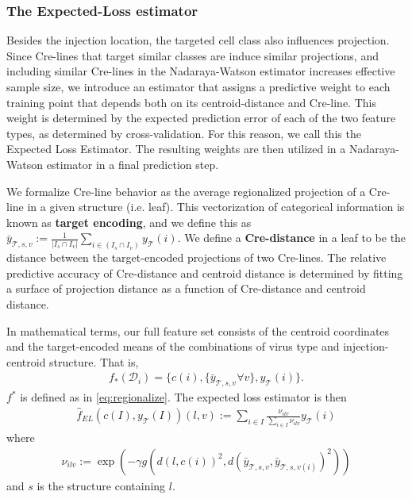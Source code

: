 \newpage
\subsubsection{The Expected-Loss estimator}

\label{supp_sec:el}

Besides the injection location, the targeted cell class also influences projection.
Since Cre-lines that target similar classes are induce similar projections, and including similar Cre-lines in the Nadaraya-Watson estimator increases effective sample size, we introduce an estimator that assigns a predictive weight to each training point that depends both on its centroid-distance and Cre-line.
This weight is determined by the expected prediction error of each of the two feature types, as determined by cross-validation.
For this reason, we call this the Expected Loss Estimator.
The resulting weights are then utilized in a Nadaraya-Watson estimator in a final prediction step.

We formalize Cre-line behavior as the average regionalized projection of a Cre-line in a given structure (i.e. leaf).
This vectorization of categorical information is known as \textbf{target encoding}, and we define this as $\bar y_{\mathcal T,s,v} := \frac{1}{|I_s \cap I_v|}  \sum_{i \in (I_s \cap I_v)} y_{\mathcal T}(i)$.
We define a \textbf{Cre-distance} in a leaf to be the distance between the target-encoded projections of two Cre-lines.
The relative predictive accuracy of Cre-distance and centroid distance is determined by fitting a surface of projection distance as a function of Cre-distance and centroid distance. 

In mathematical terms, our full feature set consists of the centroid coordinates and the target-encoded means of the combinations of virus type and injection-centroid structure.
That is, 
\begin{eqnarray*}
f_*({\mathcal D}_i) = \{c(i) , \{\bar y_{\mathcal T,s,v}  \forall v \}, y_{\mathcal T}(i) \}.
\end{eqnarray*}
$f^*$ is defined as in \eqref{eq:regionalize}.
The expected loss estimator is then 
\begin{eqnarray*}
\hat f_{EL} ( c(I),y_{\mathcal T} (I))(l,v) :=  \sum_{i \in I} \frac{ \nu_{ilv} }{\sum_{i \in I}  \nu_{ilv}  } y_{\mathcal T}(i)
\end{eqnarray*}
where
\begin{eqnarray*}
\nu_{ilv} := \exp (- \gamma g( d(l, c(i))^2, d(\bar y_{\mathcal T,s,v} , \bar y_{\mathcal T,s,v(i)}  )^2))
\end{eqnarray*}
and $s$ is the structure containing $l$.

